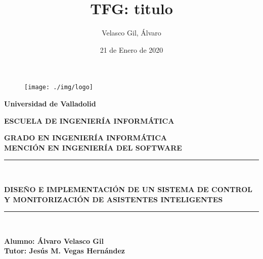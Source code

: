 \documentclass[openright,twoside,10pt]{book}
\date{21 de Enero de 2020}
\author{Velasco Gil, Álvaro}
\title{TFG: titulo}
\begin{document}
\begin{titlepage}

\begin{center}
\vspace*{-1in}
\begin{figure}[htb]
\begin{center}
\texttt{[image: ./img/logo]}
\end{center}
\end{figure}
\begin{large}
\textbf{Universidad de Valladolid}
\end{large}

\vspace*{0.15in}

\vspace*{0.6in}
\begin{large}
\textbf{ESCUELA DE INGENIERÍA INFORMÁTICA}

\end{large}
\vspace*{0.2in}
\textbf{ GRADO EN INGENIERÍA INFORMÁTICA}\\
\textbf{ MENCIÓN EN INGENIERÍA DEL SOFTWARE }
\vspace*{0.1in}
\rule{140mm}{0.1mm}\\
\vspace*{0.2in}
\begin{large}
\textbf{{\LARGE DISEÑO E IMPLEMENTACIÓN DE UN SISTEMA DE CONTROL Y MONITORIZACIÓN DE ASISTENTES INTELIGENTES\\}}
\end{large}
\vspace*{0.2in}
\rule{140mm}{0.1mm}\\
\vspace*{2in}
\begin{large}
\begin{flushright}
\textbf{Alumno: Álvaro Velasco Gil \\
\vspace*{0.3in}
Tutor: Jesús M. Vegas Hernández }
\end{flushright}
\end{large}
\end{center}

\end{titlepage}

\newpage
\mbox{}	
\thispagestyle{empty} %

\chapter*{}

\end{document}

